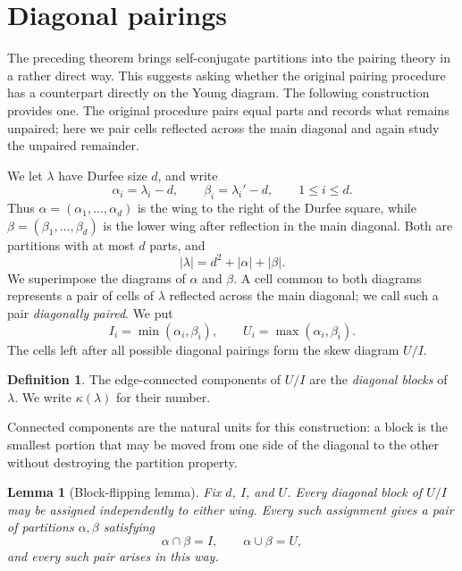 \documentclass[11pt]{article}
\newtheorem{lemma}[theorem]{Lemma}
\theoremstyle{definition}
\newtheorem{definition}[theorem]{Definition}
\theoremstyle{remark}
\begin{document}
\section{Diagonal pairings}\label{sec:diagonal-pairing}

The preceding theorem brings self-conjugate partitions into the pairing theory in a rather direct way.  This suggests asking whether the original pairing procedure has a counterpart directly on the Young diagram.  The following construction provides one.  The original procedure pairs equal parts and records what remains unpaired; here we pair cells reflected across the main diagonal and again study the unpaired remainder.

We let $\lambda$ have Durfee size $d$, and write
\[
 \alpha_i=\lambda_i-d,
 \qquad
 \beta_i=\lambda_i'-d,
 \qquad 1\leq i\leq d.
\]
Thus $\alpha=(\alpha_1,\ldots,\alpha_d)$ is the wing to the right of the Durfee square, while $\beta=(\beta_1,\ldots,\beta_d)$ is the lower wing after reflection in the main diagonal.  Both are partitions with at most $d$ parts, and
\[
 |\lambda|=d^2+|\alpha|+|\beta|.
\]
We superimpose the diagrams of $\alpha$ and $\beta$.  A cell common to both diagrams represents a pair of cells of $\lambda$ reflected across the main diagonal; we call such a pair \emph{diagonally paired}.  We put
\[
 I_i=\min(\alpha_i,\beta_i),
 \qquad
 U_i=\max(\alpha_i,\beta_i).
\]
The cells left after all possible diagonal pairings form the skew diagram $U/I$.

\begin{definition}
The edge-connected components of $U/I$ are the \emph{diagonal blocks} of $\lambda$.  We write $\kappa(\lambda)$ for their number.
\end{definition}

Connected components are the natural units for this construction: a block is the smallest portion that may be moved from one side of the diagonal to the other without destroying the partition property.

\begin{lemma}[Block-flipping lemma]\label{lem:block-flipping}
Fix $d$, $I$, and $U$.  Every diagonal block of $U/I$ may be assigned independently to either wing.  Every such assignment gives a pair of partitions $\alpha,\beta$ satisfying
\[
 \alpha\cap\beta=I,
 \qquad
 \alpha\cup\beta=U,
\]
and every such pair arises in this way.
\end{lemma}
\end{document}

